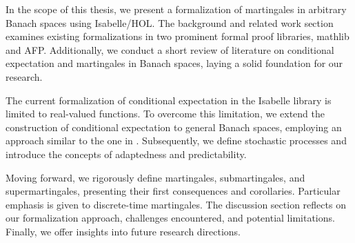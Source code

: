 In the scope of this thesis, we present a formalization of martingales in arbitrary Banach spaces using Isabelle/HOL. The background and related work section examines existing formalizations in two prominent formal proof libraries, mathlib and \ac{AFP}. Additionally, we conduct a short review of literature on conditional expectation and martingales in Banach spaces, laying a solid foundation for our research.

The current formalization of conditional expectation in the Isabelle library is limited to real-valued functions. To overcome this limitation, we extend the construction of conditional expectation to general Banach spaces, employing an approach similar to the one in \cite{Hytoenen_2016}. Subsequently, we define stochastic processes and introduce the concepts of adaptedness and predictability.

Moving forward, we rigorously define martingales, submartingales, and supermartingales, presenting their first consequences and corollaries. Particular emphasis is given to discrete-time martingales. The discussion section reflects on our formalization approach, challenges encountered, and potential limitations. Finally, we offer insights into future research directions.